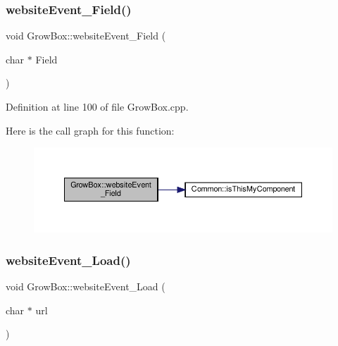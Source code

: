 \mbox{\label{class_grow_box_a5c5ba0de9289075db990a15a5c0b7634}} 
\subsubsection{\texorpdfstring{website\+Event\+\_\+\+Field()}{websiteEvent\_Field()}\hspace{0.1cm}{\footnotesize\ttfamily [2/2]}}
{\footnotesize\ttfamily void Grow\+Box\+::website\+Event\+\_\+\+Field (\begin{DoxyParamCaption}\item[{char $\ast$}]{Field }\end{DoxyParamCaption})}



Definition at line 100 of file Grow\+Box.\+cpp.

Here is the call graph for this function\+:
\nopagebreak
\begin{figure}[H]
\begin{center}
\leavevmode
\includegraphics[width=350pt]{class_grow_box_a5c5ba0de9289075db990a15a5c0b7634_cgraph}
\end{center}
\end{figure}
\mbox{\label{class_grow_box_a486cdc90cf59c3059c96b3f021eec5d5}} 
\subsubsection{\texorpdfstring{website\+Event\+\_\+\+Load()}{websiteEvent\_Load()}\hspace{0.1cm}{\footnotesize\ttfamily [1/2]}}
{\footnotesize\ttfamily void Grow\+Box\+::website\+Event\+\_\+\+Load (\begin{DoxyParamCaption}\item[{char $\ast$}]{url }\end{DoxyParamCaption})}

